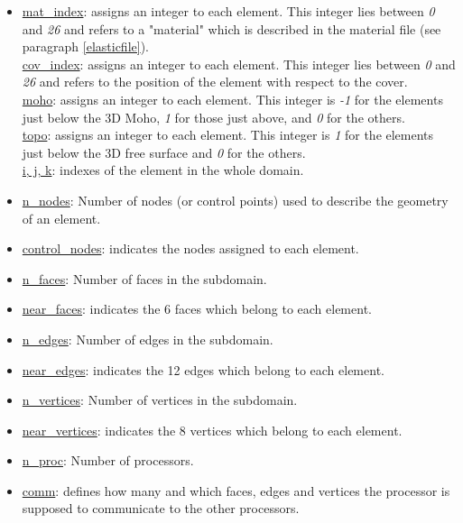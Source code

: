 \begin{itemize}[topsep=2pt,itemsep=4pt]
\item\underline{mat\_index}: assigns an integer to each element.
This integer lies between \textit{0} and \textit{26} and refers to a "material" which is described in
the material file (see paragraph \ref{elasticfile}).\\
\underline{cov\_index}: assigns an integer to each element.
This integer lies between \textit{0} and \textit{26} and refers to the position of the element with respect to the cover.\\
\underline{moho}: assigns an integer to each element.
This integer is \textit{-1} for the elements just below the 3D Moho, \textit{1} for those just above, and \textit{0} for the others.\\
\underline{topo}: assigns an integer to each element.
This integer is \textit{1} for the elements just below the 3D free surface and \textit{0} for the others.\\
\underline{i, j, k}: indexes of the element in the whole domain.

\item\underline{n\_nodes}: Number of nodes (or control points) used to describe the geometry of an element.

\item\underline{control\_nodes}: indicates the nodes assigned to each element.

\item\underline{n\_faces}: Number of faces in the subdomain.

\item\underline{near\_faces}: indicates the 6 faces which belong to each element.

\item\underline{n\_edges}: Number of edges in the subdomain.

\item\underline{near\_edges}: indicates the 12 edges which belong to each element.

\item\underline{n\_vertices}: Number of vertices in the subdomain.

\item\underline{near\_vertices}: indicates the 8 vertices which belong to each element.

\item\underline{n\_proc}: Number of processors.

\item\underline{comm}: defines how many and which faces, edges and vertices the processor is supposed to communicate to the other processors.

\end{itemize}


